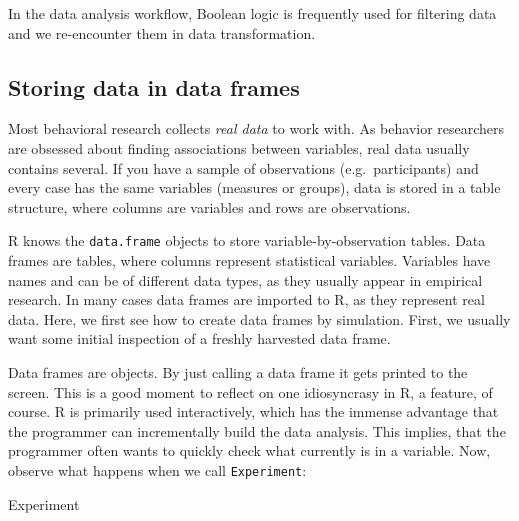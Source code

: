 \documentclass[]{svmono}
\newenvironment{Shaded}{\begin{snugshade}}{\end{snugshade}}
\newcommand{\NormalTok}[1]{#1}
\theoremstyle{definition}
\theoremstyle{definition}
\theoremstyle{definition}
\theoremstyle{remark}
\begin{document}
In the data analysis workflow, Boolean logic is frequently used for
filtering data and we re-encounter them in data transformation.

\subsection{Storing data in data
frames}\label{storing-data-in-data-frames}

Most behavioral research collects \emph{real data} to work with. As
behavior researchers are obsessed about finding associations between
variables, real data usually contains several. If you have a sample of
observations (e.g.~participants) and every case has the same variables
(measures or groups), data is stored in a table structure, where columns
are variables and rows are observations.

R knows the \texttt{data.frame} objects to store variable-by-observation
tables. Data frames are tables, where columns represent statistical
variables. Variables have names and can be of different data types, as
they usually appear in empirical research. In many cases data frames are
imported to R, as they represent real data. Here, we first see how to
create data frames by simulation. First, we usually want some initial
inspection of a freshly harvested data frame.

Data frames are objects. By just calling a data frame it gets printed to
the screen. This is a good moment to reflect on one idiosyncrasy in R, a
feature, of course. R is primarily used interactively, which has the
immense advantage that the programmer can incrementally build the data
analysis. This implies, that the programmer often wants to quickly check
what currently is in a variable. Now, observe what happens when we call
\texttt{Experiment}:

\begin{Shaded}
\begin{Highlighting}[]
\NormalTok{Experiment}
\end{Highlighting}
\end{Shaded}
\end{document}
